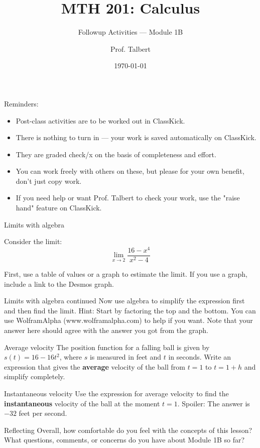 \documentclass{beamer}
\title{MTH 201: Calculus}
\subtitle{Followup Activities --- Module 1B}
\author{Prof. Talbert}
\institute{GVSU}
\date{\today}
\begin{document}
\frame{\titlepage}

\begin{frame}{Reminders:}

    \begin{itemize}
        \item Post-class activities are to be worked out in ClassKick.
        \item There is nothing to turn in --- your work is saved automatically on ClassKick. 
        \item They are graded check/x on the basis of completeness and effort. 
        \item You can work freely with others on these, but please for your own benefit, don't just copy work. 
        \item If you need help or want Prof. Talbert to check your work, use the "raise hand" feature on ClassKick. 
    \end{itemize}
    
    \end{frame}

\begin{frame}[t]{Limits with algebra}

    Consider the limit: 
        $$\lim_{x \to 2} \frac{16-x^4}{x^2-4}$$
        
     First, use a table of values or a graph to estimate the limit. If you use a graph, include a link to the Desmos graph. 
\end{frame}
        
\begin{frame}[t]{Limits with algebra continued}
    Now use algebra to simplify the expression first and then find the limit. Hint: Start by factoring the top and the bottom. You can use WolframAlpha (www.wolframalpha.com) to help if you want. Note that your answer here should agree with the answer you got from the graph. 
        
    \end{frame}

\begin{frame}[t]{Average velocity}
        The position function for a falling ball is given by $s(t) = 16 - 16t^2$, where $s$ is measured in feet and $t$ in seconds. Write an expression that gives the \textbf{average} velocity of the ball from $t=1$ to $t = 1+h$ and simplify completely. 
\end{frame}
        
\begin{frame}[t]{Instantaneous velocity}
        Use the expression for average velocity to find the \textbf{instantaneous} velocity of the ball at the moment $t=1$. Spoiler: The answer is $-32$ feet per second. 
\end{frame}
        
\begin{frame}[t]{Reflecting}
    Overall, how comfortable do you feel with the concepts of this lesson? What questions, comments, or concerns do you have about Module 1B so far?     
        
        
    \end{frame}
    
\end{document}
